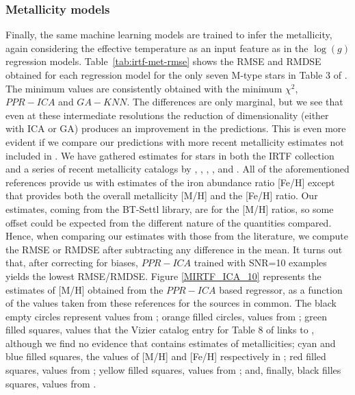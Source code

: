 \subsubsection{Metallicity models} 
\label{sect:irtf-met}
Finally, the same machine learning models are trained to infer the
metallicity, again considering the effective temperature as an input
feature as in the $\log(g)$ regression
models. Table~\ref{tab:irtf-met-rmse} shows the RMSE and RMDSE
obtained for each regression model for the only seven M-type stars in
Table 3 of \cite{cesetti}. The minimum values are consistently obtained 
with the minimum $\chi^2$, $PPR-ICA$ and $GA-KNN$. The differences are 
only marginal, but we see that even at these intermediate resolutions 
the reduction of dimensionality (either with ICA or GA) produces an 
improvement in the predictions. This is even more evident if we 
compare our predictions with more recent metallicity estimates not 
included in \cite{cesetti}. We have gathered estimates for stars in 
both the IRTF collection and a series of recent metallicity catalogs 
by \cite{RA2012}, \cite{NevesIII}, \cite{Newton2014}, \cite{Gaidos2015}, 
and \cite{Mann2015}. All of the aforementioned references provide us 
with estimates of the iron abundance ratio [Fe/H] except \cite{RA2012} that 
provides both the overall metallicity [M/H]
and the [Fe/H] ratio. Our estimates, coming from the BT-Settl library, are 
for the [M/H] ratios, so some offset could be expected from the 
different nature of the quantities compared. Hence, when comparing our 
estimates with those from the literature, we compute the RMSE or RMDSE 
after subtracting any difference in the mean. It turns out that, after 
correcting for biases, $PPR-ICA$ trained with SNR=10 examples 
yields the lowest RMSE/RMDSE. Figure \ref{MIRTF_ICA_10} 
represents the estimates of [M/H] obtained from the $PPR-ICA$ based 
regressor, as a function of the values taken from these references for 
the sources in common. The black empty circles represent values from \cite{cesetti}
; orange filled circles, values from \cite{NevesIII};  green filled 
squares, values that the Vizier catalog entry for Table 8 of 
\cite{NevesIII} links to \cite{Jao}, although we find no evidence that \cite{Jao} 
contains estimates of metallicities; cyan and blue filled squares, the values 
of [M/H] and [Fe/H] respectively in \cite{RA2012}; red filled squares, values 
from \cite{Mann2015}; yellow filled squares,  values from \cite{Newton2014}; and, 
finally, black filles squares, values from \cite{Gaidos2015}.

